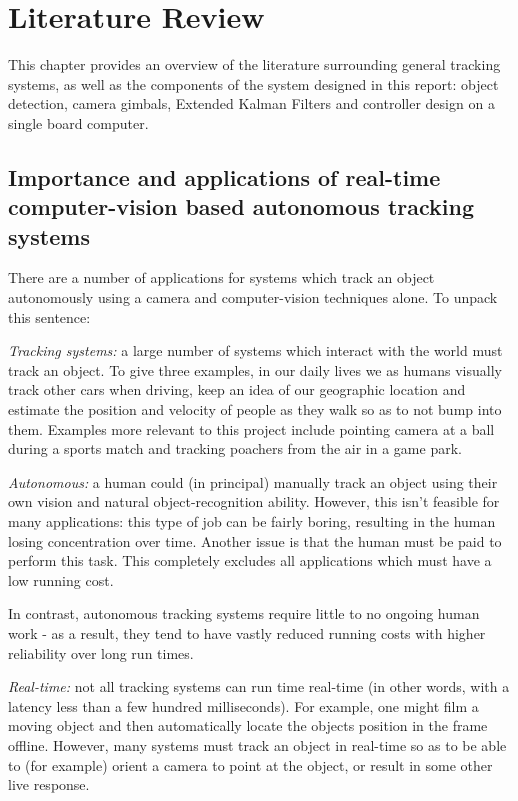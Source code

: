 \chapter{Literature Review}

This chapter provides an overview of the literature surrounding general tracking systems, as well as the components of the system designed in this report: object detection, camera gimbals, Extended Kalman Filters and controller design on a single board computer.

\section{Importance and applications of real-time computer-vision based autonomous tracking systems}
There are a number of applications for systems which track an object autonomously using a camera and computer-vision techniques alone. To unpack this sentence:

\textit{Tracking systems:} a large number of systems which interact with the world must track an object. To give three examples, in our daily lives we as humans visually track other cars when driving, keep an idea of our geographic location and estimate the position and velocity of people as they walk so as to not bump into them. Examples more relevant to this project include pointing camera at a ball during a sports match and tracking poachers from the air in a game park.

\textit{Autonomous:} a human could (in principal) manually track an object using their own vision and natural object-recognition ability. However, this isn't feasible for many applications: this type of job can be fairly boring, resulting in the human losing concentration over time. Another issue is that the human must be paid to perform this task. This completely excludes all applications which must have a low running cost.

In contrast, autonomous tracking systems require little to no ongoing human work - as a result, they tend to have vastly reduced running costs with higher reliability over long run times.

\textit{Real-time:} not all tracking systems can run time real-time (in other words, with a latency less than a few hundred milliseconds). For example, one might film a moving object and then automatically locate the objects position in the frame offline. However, many systems must track an object in real-time so as to be able to (for example) orient a camera to point at the object, or result in some other live response.

